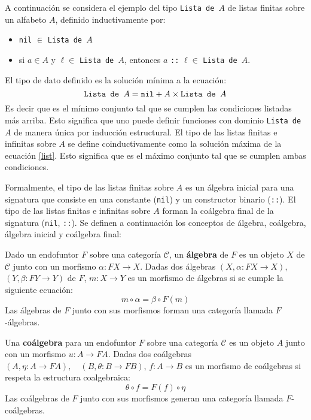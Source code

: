 A continuación se considera el ejemplo del tipo \texttt{Lista de $A$} de listas finitas sobre un alfabeto $A$, definido inductivamente por:
\begin{itemize}[label=$\blacktriangleright$]
	\item \texttt{nil} $\in$ \texttt{Lista de $A$}
	\item si $a \in A$ y $\ell \in$ \texttt{Lista de $A$}, entonces $a$ \texttt{::} $\ell \in$ \texttt{Lista de $A$}. 
\end{itemize}

El tipo de dato definido es la solución  mínima a la ecuación:
\begin{equation}\label{list}
\text{\tt Lista de $A$} = \text{\tt nil} + A \times \text{\tt Lista de $A$}
\end{equation}
Es decir que es el mínimo conjunto tal que se cumplen las condiciones listadas más arriba. Esto significa que uno puede definir funciones con dominio \texttt{Lista de $A$} de manera única por inducción estructural. El tipo de las listas finitas e infinitas sobre $A$ se define coinductivamente como la solución máxima de la ecuación \ref{list}. Esto significa que es el máximo conjunto tal que se cumplen ambas condiciones. 

Formalmente, el tipo de las listas finitas sobre $A$ es un álgebra inicial para una signatura que consiste en una constante (\texttt{nil}) y un constructor binario (\texttt{::}). El tipo de las listas finitas e infinitas sobre $A$ forman la coálgebra final de la signatura (\texttt{nil}, \texttt{::}). Se definen a continuación los conceptos de álgebra, coálgebra, álgebra inicial y coálgebra final:

\begin{definition}
Dado un endofuntor $\mathit{F}$ sobre una categoría $\mathscr{C}$, un \textbf{álgebra} de $\mathit{F}$ es un objeto $X$ de $\mathscr{C}$ junto con un morfismo $\alpha : \mathit{F}X \rightarrow X$. Dadas dos álgebras $(X, \alpha : \mathit{F}X \rightarrow X)$, $(Y, \beta : \mathit{F}Y \rightarrow Y)$ de $F$, $m : X \rightarrow Y$ es un morfismo de álgebras si se cumple la siguiente ecuación:
\begin{equation*}
m \circ \alpha = \beta \circ \mathit{F}(m)
\end{equation*}
Las álgebras de $\mathit{F}$ junto con sus morfismos forman una categoría llamada $\mathit{F}$-álgebras. 
\end{definition}

\begin{definition}[Coálgebra]
Una \textbf{coálgebra} para un endofuntor $\mathit{F}$ sobre una categoría $\mathscr{C}$ es un objeto $A$ junto con un morfismo $u : A \rightarrow \mathit{F} A$. Dadas dos coálgebras $(A, \eta : A \rightarrow \mathit{F}A), \quad (B, \theta : B \rightarrow \mathit{F}B)$, $f : A \rightarrow B$ es un morfismo de coálgebras si respeta la estructura coalgebraica: 
\begin{equation*}
\theta \circ f = \mathit{F}(f) \circ \eta
\end{equation*} 
Las coálgebras de $\mathit{F}$ junto con sus morfismos generan una categoría llamada $\mathit{F}$-coálgebras.
\end{definition}

